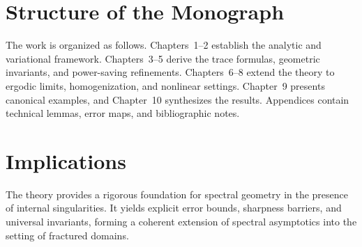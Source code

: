 \section*{Structure of the Monograph}

The work is organized as follows.  
Chapters~1–2 establish the analytic and variational framework.  
Chapters~3–5 derive the trace formulas, geometric invariants, and power-saving refinements.  
Chapters~6–8 extend the theory to ergodic limits, homogenization, and nonlinear settings.  
Chapter~9 presents canonical examples, and Chapter~10 synthesizes the results.  
Appendices contain technical lemmas, error maps, and bibliographic notes.

\section*{Implications}

The theory provides a rigorous foundation for spectral geometry in the 
presence of internal singularities. It yields explicit error bounds, 
sharpness barriers, and universal invariants, forming a coherent extension 
of spectral asymptotics into the setting of fractured domains. 

